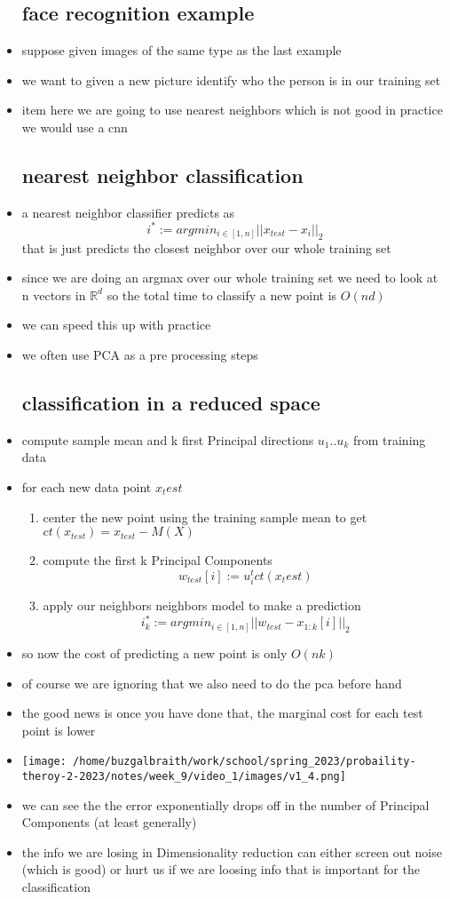 \documentclass{article}
\begin{document}
\begin{itemize}
\subsection*{face recognition example}
\item suppose given images of the same type as the last example
\item we want to given a new picture identify who the person is in our training set 
\item item here we are going to use nearest neighbors which is not good  in practice we would use a cnn 
\subsection*{nearest neighbor classification }
\item a nearest neighbor classifier predicts as $$i^{*}:=argmin_{i\in [1,n]}||x_{test}-x_{i}||_2$$ that is just predicts the closest neighbor over our whole training set 
\item since we are doing an argmax over our whole training set we need to look at n vectors in $\mathbb{R}^{d}$ so the total time to classify a new point is $O(nd)$
\item we can speed this up with practice
\item we often use PCA as a pre processing steps
\subsection*{classification in a reduced space}
\item compute sample mean and k first Principal directions $u_1..u_k$ from training data 
\item for each new data point $x_test$
\begin{enumerate}
    \item center the new point using the training sample mean to get $ct(x_{test})=x_{test}-M(X)$
    \item compute the first k Principal Components $$w_{test}[i]:=u_i^{t}ct(x_test)$$
    \item apply our neighbors neighbors  model to make a prediction 
     $$i^{*}_{k}:=argmin_{i\in [1,n]}||w_{test}-x_{1:k}[i]||_2$$
\end{enumerate}
\item so now the cost of predicting a new point is only $O(nk)$ 
\item of course we are ignoring that we also need to do the pca before hand 
\item the good news is once you have done that, the marginal cost for each test point is lower 
\item \texttt{[image: /home/buzgalbraith/work/school/spring\_2023/probaility-theroy-2-2023/notes/week\_9/video\_1/images/v1\_4.png]}
\item we can see the the error exponentially drops off in the number of Principal Components (at least generally)
\item the info we are losing in Dimensionality reduction can either screen out noise  (which is good) or hurt us if we are loosing info that is important for the classification

\end{itemize}
\end{document}

